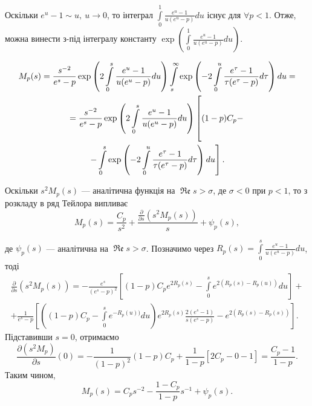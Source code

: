 Оскільки $e^u - 1 \sim u,~u \rightarrow 0$, то інтеграл $\int\limits_{0}^{1} \frac{e^u -1}{u(e^u - p)} du$ існує для $\forall p < 1$. Отже, можна винести з-під інтегралу константу $\exp\left(\int\limits_{0}^{1} \frac{e^u -1}{u(e^u - p)} du\right)$.

\begin{gather*}
M_{p}(s) = \frac{s^{-2}}{e^s-p} \exp \left(2 \int\limits_{0}^{s} \frac{e^u -1}{u(e^u - p)} du\right) \int\limits_s^\infty \exp\left(-2 \int\limits_{0}^{u} \frac{e^\tau -1}{\tau(e^\tau - p)} d\tau\right) du = \\
=\frac{s^{-2}}{e^s-p} \exp \left(2 \int\limits_{0}^{s} \frac{e^u -1}{u(e^u - p)} du\right) \left[\rule{0cm}{1.05cm} (1-p) C_{p} - \right. \\
\left.- \int\limits_0^s \exp\left(-2 \int\limits_{0}^{u} \frac{e^\tau -1}{\tau(e^\tau - p)} d\tau\right) du \right].
\end{gather*}

Оскільки $s^2 M_{p}(s)$ --- аналітична функція на $\operatorname{\mathfrak{Re}} s > \sigma$, де $\sigma < 0$ при $p < 1$, то з розкладу в ряд Тейлора випливає
\begin{equation}
M_{p}(s) = \frac{C_{p}}{s^2} + \frac{\frac{\partial}{\partial s}(s^2 M_{p}(s))}{s} + \psi_{p}(s),
\end{equation}

де $\psi_{p}(s)$ --- аналітична на $\operatorname{\mathfrak{Re}} s > \sigma$. Позначимо через $R_{p}(s)=\int\limits_{0}^{s} \frac{e^u -1}{u(e^u - p)} du$, тоді
\begin{gather*}
\frac{\partial}{\partial s}(s^2 M_{p}(s)) = -\frac{e^s}{(e^s - p)^2} \left[(1-p) C_{p} e^{2 R_{p}(s)} - \int\limits_{0}^{s} e^{2(R_{p}(s) - R_{p}(u))} du\right] + \\
+ \frac{1}{e^s - p} \left[ \left((1 - p) C_{p} - \int\limits_{0}^{s} e^{- R_{p}(u))} du\right) e^{2R_{p}(s)} \frac{2(e^s - 1)}{s(e^s - p)} - e^{2(R_{p}(s) - R_{p}(s))} \right].
\end{gather*}
Підставивши $s = 0$, отримаємо
\begin{equation*}
\frac{\partial (s^2 M_{p})}{\partial s}(0) = -\frac{1}{(1-p)^2} (1-p) C_{p} + \frac{1}{1-p} \left[ 2 C_{p} - 0 - 1 \right] = \frac{C_{p} - 1}{1 - p}.
\end{equation*}
Таким чином,
\begin{equation}
\label{eq:model_laplace_taylor}
M_{p}(s) = C_{p} s^{-2} - \frac{1 - C_{p}}{1 - p} s^{-1} + \psi_{p}(s).
\end{equation}

